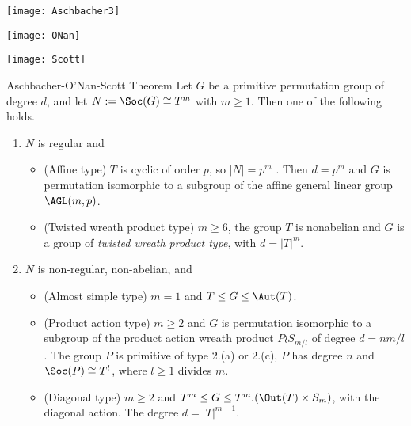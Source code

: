 \begin{frame}[fragile,label=OSTheorem]{}
\vskip2mm
\hskip3mm
\texttt{[image: Aschbacher3]}
\begin{center}
\texttt{[image: ONan]}
\end{center}
\hfill    
\texttt{[image: Scott]}

\end{frame}

\begin{frame}[fragile,label=OSTheorem]{Aschbacher-O'Nan-Scott Theorem}
Let $G$ be a primitive permutation
group of degree $d$, and let $N := \Soc(G) \cong T^m$ with $m \geq 1$. 
Then one of the following holds.
\vskip2mm
\begin{enumerate}
\item 
$N$ is regular and
  \begin{itemize}
  \item 
  \alert{(Affine type)} $T$ is cyclic of order $p$, so $|N| = p^m$ . Then 
$d = p^m$ and $G$ is permutation isomorphic to a subgroup of the affine
general linear group $\AGL(m,p)$.
\vskip2mm
\item \alert{(Twisted wreath product type)} $m \geq 6$, the group $T$ is 
  nonabelian and $G$ is a group of \emph{twisted wreath product type}, with
  $d = |T|^m$.
  \end{itemize}
\vskip2mm
\item $N$ is non-regular, non-abelian, and
  \begin{itemize}
  \item 
\alert{(Almost simple type)} $m = 1$ and $T \leq G \leq \Aut(T)$.
\vskip2mm
\item \alert{(Product action type)} $m \geq 2$ and $G$ is permutation isomorphic to a
subgroup of the product action wreath product $P \wr S_{m/l}$ of degree
$d = nm/l$. The group $P$ is primitive of type 2.(a) or 2.(c), $P$ has
degree $n$ and $\Soc(P) \cong T^l$, where $l \geq 1$ divides $m$.
\vskip2mm
\item 
\alert{(Diagonal type)} $m \geq 2$ and $T^m \leq G \leq T^m . (\Out(T ) \times S_m)$, with
the diagonal action. The degree $d = |T|^{m-1}$.
  \end{itemize}
\end{enumerate}
\end{frame}

